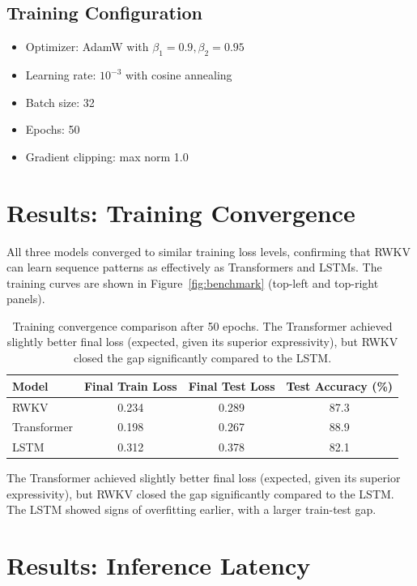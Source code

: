 \documentclass[12pt]{article}
\begin{document}
\subsection*{Training Configuration}
\begin{itemize}
    \item Optimizer: AdamW with $\beta_1=0.9, \beta_2=0.95$
    \item Learning rate: $10^{-3}$ with cosine annealing
    \item Batch size: 32
    \item Epochs: 50
    \item Gradient clipping: max norm 1.0
\end{itemize}

\section*{Results: Training Convergence}

All three models converged to similar training loss levels, confirming that RWKV can learn sequence patterns as effectively as Transformers and LSTMs. The training curves are shown in Figure~\ref{fig:benchmark} (top-left and top-right panels).

\begin{table}[h]
    \centering
    \begin{tabular}{lccc}
        \hline
        Model & Final Train Loss & Final Test Loss & Test Accuracy (\%) \\
        \hline
        RWKV & 0.234 & 0.289 & 87.3 \\
        Transformer & 0.198 & 0.267 & 88.9 \\
        LSTM & 0.312 & 0.378 & 82.1 \\
        \hline
    \end{tabular}
    \caption{Training convergence comparison after 50 epochs. The Transformer achieved slightly better final loss (expected, given its superior expressivity), but RWKV closed the gap significantly compared to the LSTM.}
    \label{tab:convergence}
\end{table}

The Transformer achieved slightly better final loss (expected, given its superior expressivity), but RWKV closed the gap significantly compared to the LSTM. The LSTM showed signs of overfitting earlier, with a larger train-test gap.

\section*{Results: Inference Latency}
\end{document}

